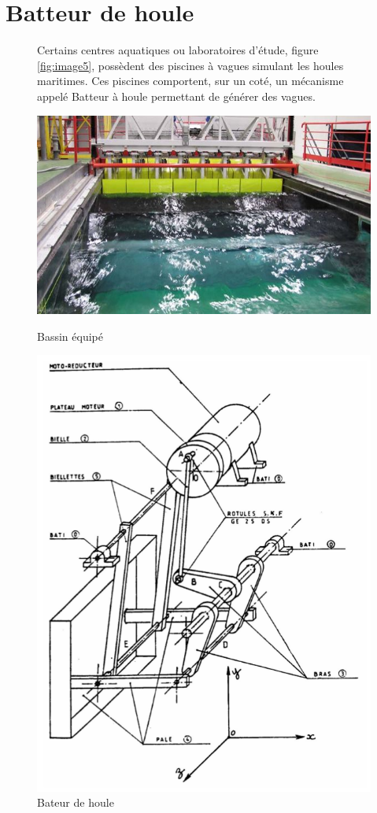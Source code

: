 \newpage

\section{Batteur de houle}

\begin{figure}[!h]
\begin{minipage}[c]{.6\linewidth}
Certains centres aquatiques ou laboratoires d'étude, figure \ref{fig:image5}, possèdent des piscines à vagues simulant les houles maritimes. Ces piscines comportent, sur un coté, un mécanisme appelé \og Batteur à houle \fg permettant de générer des vagues.

\centering\includegraphics[width=0.8\linewidth]{img/batteur.jpg}
\caption{Bassin équipé}
\label{fig:image5}
\end{minipage}
\hfill
\begin{minipage}[c]{.35\linewidth}
\begin{center}
\includegraphics[width=0.9\linewidth]{img/Batteur1.png}
\caption{Bateur de houle}
\label{fig:image6}
\end{center}
\end{minipage}
\end{figure}

